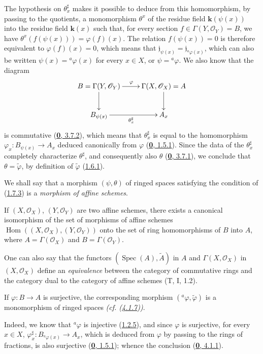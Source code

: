 The hypothesis on $\theta_x^{\sharp}$ makes it possible to deduce from this
homomorphism, by passing to the quotients, a monomorphism $\theta^x$ of the
residue field $\boldsymbol{k}(\psi(x))$ into the residue field $\boldsymbol{k}(x)$ such that, for every
section $f\in\Gamma(Y,\mathscr{O}_Y)=B$, we have
$\theta^x(f(\psi(x)))=\varphi(f)(x)$. The relation $f(\psi(x))=0$ is
therefore equivalent to $\varphi(f)(x)=0$, which means that
$\mathfrak{j}_{\psi(x)}=\mathfrak{j}_{{}^a\varphi(x)}$, which can also be
written $\psi(x)={}^a\varphi(x)$ for every $x\in X$, or $\psi={}^a\varphi$.
We also know that the diagram
\label{I.1.7.3.diagram}
\[
  \xymatrix{
    B=\Gamma(Y,\mathscr{O}_Y)\ar[r]^\varphi\ar[d] &
    \Gamma(X,\mathscr{O}_X)=A\ar[d]\\
    B_{\psi(x)}\ar[r]_{\theta_x^{\sharp}} & A_x
  }
\]
is commutative (\hyperref[0.3.7.2]{\textbf{0}, 3.7.2}), which means that
$\theta_x^{\sharp}$ is equal to the homomorphism
$\varphi_x:B_{\psi(x)}\to A_x$ deduced canonically from $\varphi$
(\hyperref[0.1.5.1]{\textbf{0}, 1.5.1}). Since the data of the $\theta_x^{\sharp}$
completely characterize $\theta^{\sharp}$, and consequently also $\theta$
(\hyperref[0.3.7.1]{\textbf{0}, 3.7.1}), we conclude that
$\theta=\widetilde\varphi$, by definition of $\widetilde\varphi$
(\hyperref[I.1.6.1]{1.6.1}).

We shall say that a morphism $(\psi,\theta)$ of ringed spaces satisfying
the condition of (\hyperref[I.1.7.3]{1.7.3}) is a \emph{morphism of
affine schemes}.

\begin{corollary}[1.7.4]
\label{I.1.7.4}
If $(X,\mathscr{O}_X)$, $(Y,\mathscr{O}_Y)$ are two affine schemes, there
exists a canonical isomorphism of the set of morphisms of affine
schemes
$\operatorname{Hom}((X,\mathscr{O}_X),(Y,\mathscr{O}_Y))$ onto the set
of ring homomorphisms of $B$ into $A$, where
$A=\Gamma(\mathscr{O}_X)$ and $B=\Gamma(\mathscr{O}_Y)$.
\end{corollary}

One can also say that the functors $(\operatorname{Spec}(A),\widetilde A)$
in $A$ and $\Gamma(X,\mathscr{O}_X)$ in $(X,\mathscr{O}_X)$ define an
\emph{equivalence} between the category of commutative rings and the
category dual to the category of affine schemes (T, I, 1.2).

\begin{corollary}[1.7.5]
\label{I.1.7.5}
If $\varphi:B\to A$ is surjective, the corresponding morphism
$({}^a\varphi,\widetilde\varphi)$ is a monomorphism of ringed spaces
\emph{(cf. \textup{(\hyperref[I.4.1.7]{4.1.7})})}.
\end{corollary}

Indeed, we know that ${}^a\varphi$ is injective
(\hyperref[I.1.2.5]{1.2.5}), and since $\varphi$ is surjective, for every
$x\in X$, $\varphi_x^{\sharp}:B_{{}^a\varphi(x)}\to A_x$, which is deduced from
$\varphi$ by passing to the rings of fractions, is also surjective
(\hyperref[0.1.5.1]{\textbf{0}, 1.5.1}); whence the conclusion
(\hyperref[0.4.1.1]{\textbf{0}, 4.1.1}).
